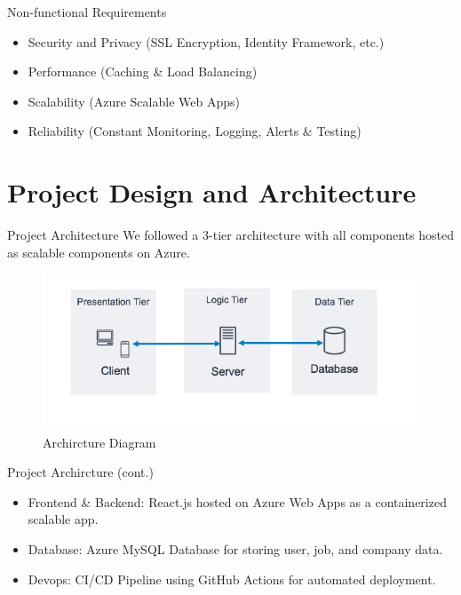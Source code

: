 \documentclass{beamer}
\begin{document}
\begin{frame}{Non-functional Requirements}
    \begin{itemize}
        \item Security and Privacy (SSL Encryption, Identity Framework, etc.)
        \item Performance (Caching \& Load Balancing)
        \item Scalability (Azure Scalable Web Apps)
        \item Reliability (Constant Monitoring, Logging, Alerts \& Testing)
    \end{itemize}
\end{frame}

\section{Project Design and Architecture}

\begin{frame}{Project Architecture}
We followed a 3-tier architecture with all components hosted as scalable components on Azure.
    \begin{figure}
        \centering
        \includegraphics[width=1\textwidth]{Images/Archircture.png}
        \caption{Archircture Diagram}
    \end{figure}
\end{frame}

\begin{frame}{Project Archircture (cont.)}
    \begin{itemize}
        \item Frontend \& Backend: React.js hosted on Azure Web Apps as a containerized scalable app.
        \item Database: Azure MySQL Database for storing user, job, and company data.
        \item Devops: CI/CD Pipeline using GitHub Actions for automated deployment.
    \end{itemize}
\end{frame}
\end{document}
